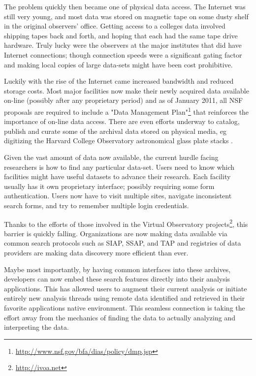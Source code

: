 \documentclass[11pt,twoside]{article}
\begin{document}
The problem quickly then became one of physical data access.  The Internet
was still very young, and most data was stored on magnetic tape on
some dusty shelf in the original observers' office.  Getting access
to a colleges data involved shipping tapes back and forth, and
hoping that each had the same tape drive hardware.  Truly lucky were the
observers at the major institutes that did have Internet connections;
though connection speeds were a significant gating factor and making
local copies of large data-sets might have been cost prohibitive.

Luckily with the rise of the Internet came increased bandwidth and
reduced storage costs.  Most major facilities now make their newly
acquired data available on-line (possibly after any proprietary period)
and as of January 2011, all NSF proposals are required to include a "Data
Management Plan"\footnote{ \url{http://www.nsf.gov/bfa/dias/policy/dmp.jsp}}
 that reinforces the importance of on-line data access.
There are even efforts underway to catalog, publish and curate some of
the archival data stored on physical media, eg digitizing the Harvard
College Observatory astronomical glass plate stacks \citep{2006vopc.conf...54M}.

Given the vast amount of data now available, the current hurdle facing
researchers is how to find any particular data-set.  Users need to know
which facilities might have useful datasets to advance their research.
Each facility usually has it own proprietary interface; possibly
requiring some form authentication.  Users now have to visit multiple
sites,  navigate inconsistent search forms, and try to remember multiple
login credentials.

Thanks to the efforts of those involved in the Virtual Observatory
projects\footnote{ \url{http://ivoa.net}}, this barrier is quickly falling.  Organizations are now making
data available via common search protocols such as SIAP, SSAP, and TAP and  registries of data providers are making data discovery more
efficient than ever.

Maybe most importantly, by having common interfaces into these archives,
developers can now embed these search features directly into their
analysis applications.  This has allowed users to augment their current
analysis or initiate entirely new analysis threads using remote data 
identified and retrieved in 
their favorite applications native environment.  This seamless connection
is taking the effort away from the mechanics of finding the data to
actually analyzing and interpreting the data.
\end{document}
